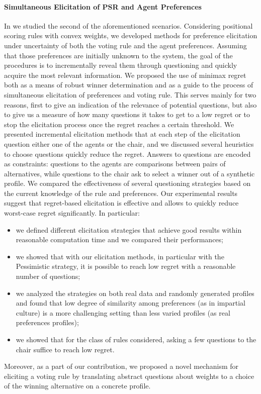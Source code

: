 \paragraph{Simultaneous Elicitation of PSR and Agent Preferences}
In  we studied the second of the aforementioned scenarios. Considering positional scoring rules with convex weights, we developed methods for preference elicitation under uncertainty of both the voting rule and the agent preferences.
Assuming that those preferences are initially unknown to the system, the goal of the procedures is to incrementally reveal them through questioning and quickly acquire the most relevant information.
We proposed the use of minimax regret both as a means of robust winner determination and as a guide to the process of simultaneous elicitation of preferences and voting rule.
This serves mainly for two reasons, first to give an indication of the relevance of potential questions, but also to give us a measure of how many questions it takes to get to a low regret or to stop the elicitation process once the regret reaches a certain threshold.
We presented incremental elicitation methods that at each step of the elicitation question either one of the agents or the chair, and we discussed several heuristics to choose questions  quickly reduce the regret. Answers to questions are encoded as constraints: questions to the agents are comparisons between pairs of alternatives, while questions to the chair ask to select a winner out of a synthetic profile.
We compared the effectiveness of several questioning strategies based on the current knowledge of the rule and preferences. 
Our experimental results suggest that regret-based elicitation is effective and allows to quickly reduce worst-case regret significantly. In particular:
\begin{itemize}
	\item we defined different elicitation strategies that achieve good results within reasonable computation time and we compared their performances;
	\item we showed that with our elicitation methods, in particular with the Pessimistic strategy, it is possible to reach low regret with a reasonable number of questions;
	\item we analyzed the strategies on both real data and randomly generated profiles and found that low degree of similarity among preferences (as in impartial culture) is a more challenging setting than less varied profiles (as real preferences profiles);
	\item we showed that for the class of rules considered, asking a few questions to the chair suffice to reach low regret.
\end{itemize}
Moreover, as a part of our contribution, we proposed a novel mechanism for eliciting a voting rule by translating abstract questions about weights to a choice of the winning alternative on a concrete profile.


